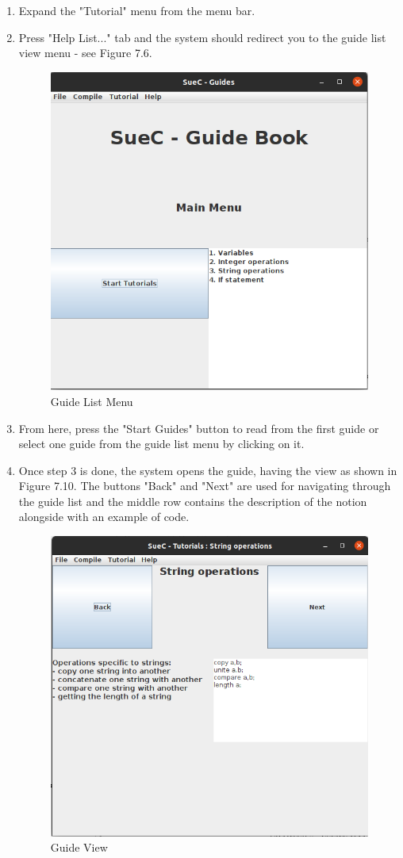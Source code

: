 \documentclass[12pt,a4paper,twoside]{report}
\begin{document}
\begin{enumerate}
\item Expand the "Tutorial" menu from the menu bar.
\item Press "Help List..." tab and the system should redirect you to the guide list view menu - see Figure 7.6.

\begin{figure}[H]
    \centering
    \includegraphics[width=0.65\linewidth]{img/userGuide/GuideListMenu.png}
    \caption{Guide List Menu}
    \label{fig:conf}
\end{figure}

\item From here, press the "Start Guides" button to read from the first guide or select one guide from the guide list menu by clicking on it.

\item Once step 3 is done, the system opens the guide, having the view as shown in Figure 7.10. The buttons "Back" and "Next" are used for navigating through the guide list and the middle row contains the description of the notion alongside with an example of code.

\begin{figure}[H]
    \centering
    \includegraphics[width=0.7\linewidth]{img/userGuide/GuideDialog.png}
    \caption{Guide View}
    \label{fig:conf}
\end{figure}


\end{enumerate}
\end{document}
